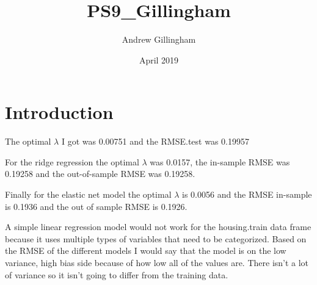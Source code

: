 \documentclass{article}
\title{PS9_Gillingham}
\author{Andrew Gillingham }
\date{April 2019}
\begin{document}
\maketitle

\section{Introduction}

The optimal $\lambda$ I got was 0.00751 and the RMSE.test was 0.19957

For the ridge regression the optimal $\lambda$ was 0.0157, the in-sample RMSE was 0.19258 and the out-of-sample RMSE was 0.19258.

Finally for the elastic net model the optimal $\lambda$ is 0.0056 and the RMSE in-sample is 0.1936 and the out of sample RMSE is 0.1926. 

A simple linear regression model would not work for the housing.train data frame because it uses multiple types of variables that need to be categorized. 
Based on the RMSE of the different models I would say that the model is on the low variance, high bias side because of how low all of the values are. There isn't a lot of variance so it isn't going to differ from the training data.  
\end{document}
